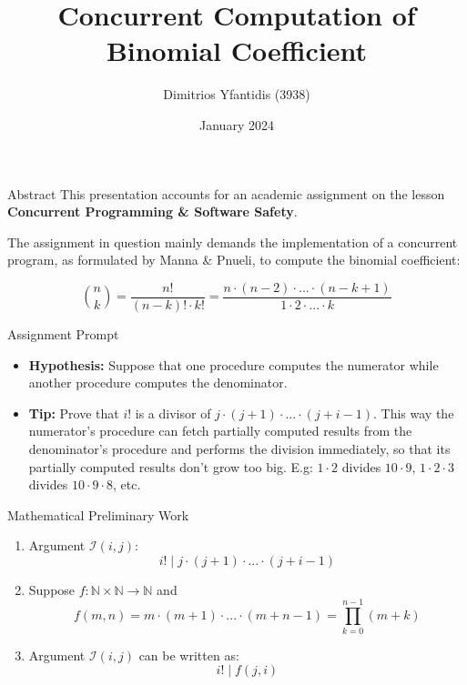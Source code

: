 \documentclass[xcolor=dvipsnames]{beamer}
\title{Concurrent Computation of Binomial Coefficient}
\author{Dimitrios Yfantidis (3938)}
\institute{Aristotle University of Thessaloniki, \\
Faculty of Sciences, Department of Informatics}
\date{January 2024}
\begin{document}
\maketitle

\begin{frame}
\titlepage
{\small
\doclicenseThis
}
\end{frame}

\begin{frame}{Abstract}
    This presentation accounts for an academic assignment on the lesson 
    \textbf{Concurrent Programming \& Software Safety}. 
    
    \pause
    \hfill

    The assignment in question mainly demands the implementation of a concurrent 
    program, as formulated by Manna \& Pnueli, to compute the binomial coefficient:
    
\[
    \binom{n}{k} = \frac{n!}{(n-k)! \cdot k!} = 
    \frac{n \cdot (n-2) \cdot ... \cdot (n-k+1)}{1 \cdot 2 \cdot ... \cdot k}
\]

\end{frame}

\begin{frame}{Assignment Prompt}
    \begin{itemize}
        \item<1-> \textbf{Hypothesis:} Suppose that one procedure computes the numerator while another procedure computes the denominator.
        \item<2-> \textbf{Tip:} 
        Prove that $i!$ is a divisor of $j \cdot (j+1) \cdot ... \cdot (j + i - 1)$. 
        This way the numerator's procedure can fetch partially computed results from 
        the denominator's procedure and performs the division immediately, so that 
        its partially computed results don't grow too big. E.g: $1 \cdot 2$ divides 
        $10 \cdot 9$, $1 \cdot 2 \cdot 3$ divides $10 \cdot 9 \cdot 8$, etc.
    \end{itemize}
\end{frame}

\begin{frame}{Mathematical Preliminary Work}
    \begin{enumerate}
        \item Argument $\mathcal{I}(i, j)$: 
        \[
            i! \mid j \cdot (j + 1) \cdot ... \cdot (j + i -1)
        \]
        \item Suppose $f:\mathbb{N}\times \mathbb{N} \rightarrow \mathbb{N}$ and
        \[
            f(m, n) = m \cdot (m + 1) \cdot ... \cdot (m + n - 1) = 
            \prod_{k=0}^{n-1}(m + k)
        \]
        \item Argument $\mathcal{I}(i, j)$ can be written as:
        \[
            i! \mid f(j, i)
        \]
    \end{enumerate}
\end{frame}
\end{document}
